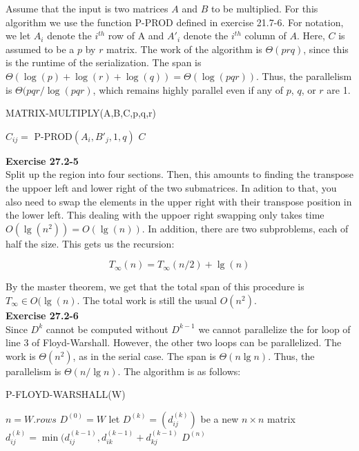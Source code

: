 \documentclass{article}
\begin{document}
Assume that the input is two matrices $A$ and $B$ to be multiplied.  For this algorithm we use the function P-PROD defined in exercise 21.7-6.  For notation, we let $A_i$ denote the $i^{th}$ row of A and $A'_i$ denote the $i^{th}$ column of $A$.  Here, $C$ is assumed to be a $p$ by $r$ matrix. The work of the algorithm is $\Theta(prq)$, since this is the runtime of the serialization.  The span is $\Theta(\log(p) + \log(r) + \log(q)) = \Theta(\log(pqr))$.  Thus, the parallelism is $ \Theta(pqr / \log(pqr)$, which remains highly parallel even if any of $p$, $q$, or $r$ are 1.\\

\begin{algorithm}
\caption{MATRIX-MULTIPLY(A,B,C,p,q,r)}
\begin{algorithmic}[1]
		\State $C_{ij} = $ P-PROD$(A_i, B'_j, 1,q)$
	\EndParFor
\EndParFor
\State \Return $C$
\end{algorithmic}
\end{algorithm}


\noindent\textbf{Exercise 27.2-5}\\

Split up the region into four sections. Then, this amounts to finding the transpose the uppoer left and lower right of the two submatrices. In adition to that, you also need to swap the elements in the upper right with their transpose position in the lower left. This dealing with the uppoer right swapping only takes time $O(\lg(n^2)) = O(\lg(n))$. In addition, there are two subproblems, each of half the size. This gets us the recursion:

\[
T_{\infty}(n) = T_{\infty}(n/2) + \lg(n)
\]

By the master theorem, we get that the total span of this procedure is $T_{\infty} \in O(\lg(n)$. The total work is still the usual $O(n^2)$.\\

\noindent\textbf{Exercise 27.2-6}\\

Since $D^k$ cannot be computed without $D^{k-1}$ we cannot parallelize the for loop of line 3 of Floyd-Warshall.  However, the other two loops can be parallelized.  The work is $\Theta(n^2)$, as in the serial case.  The span is $\Theta(n \lg n)$.  Thus, the parallelism is $\Theta(n/\lg n)$.  The algorithm is as follows:\\

\begin{algorithm}
\caption{P-FLOYD-WARSHALL(W)}
\begin{algorithmic}[1]
\State $n = W.rows$
\State $D^{(0)} = W$
	\State let $D^{(k)} = (d_{ij}^{(k)})$ be a new $n \times n$ matrix
			\State $d_{ij}^{(k)} = \min (d_{ij}^{(k-1)},d_{ik}^{(k-1)} + d_{kj}^{(k-1)} $
		\EndParFor
	\EndParFor
\EndFor
\State \Return $D^{(n)}$
\end{algorithmic}
\end{algorithm}
\end{document}
